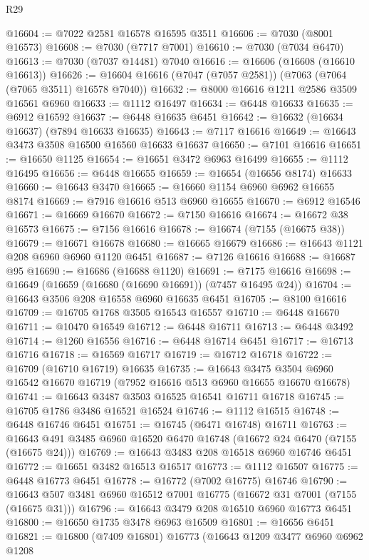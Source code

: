 \begin{lexlean}{R29}
\begin{coremodule}
@16604 := @7022 @2581 @16578 @16595 @3511
@16606 := @7030 (@8001 @16573)
@16608 := @7030 (@7717 @7001)
@16610 := @7030 (@7034 @6470)
@16613 := @7030 (@7037 @14481) @7040
@16616 := @16606 (@16608 (@16610 @16613))
@16626 := @16604 @16616 (@7047 (@7057 @2581)) (@7063 (@7064 (@7065 @3511) @16578 @7040))
@16632 := @8000 @16616 @1211 @2586 @3509 @16561 @6960
@16633 := @1112 @16497
@16634 := @6448 @16633
@16635 := @6912 @16592
@16637 := @6448 @16635 @6451
@16642 := @16632 (@16634 @16637) (@7894 @16633 @16635)
@16643 := @7117 @16616
@16649 := @16643 @3473 @3508 @16500 @16560 @16633 @16637
@16650 := @7101 @16616
@16651 := @16650 @1125
@16654 := @16651 @3472 @6963 @16499
@16655 := @1112 @16495
@16656 := @6448 @16655
@16659 := @16654 (@16656 @8174) @16633
@16660 := @16643 @3470
@16665 := @16660 @1154 @6960 @6962 @16655 @8174
@16669 := @7916 @16616 @513 @6960 @16655
@16670 := @6912 @16546
@16671 := @16669 @16670
@16672 := @7150 @16616
@16674 := @16672 @38 @16573
@16675 := @7156 @16616
@16678 := @16674 (@7155 (@16675 @38))
@16679 := @16671 @16678
@16680 := @16665 @16679
@16686 := @16643 @1121 @208 @6960 @6960 @1120 @6451
@16687 := @7126 @16616
@16688 := @16687 @95
@16690 := @16686 (@16688 @1120)
@16691 := @7175 @16616
@16698 := @16649 (@16659 (@16680 (@16690 @16691)) (@7457 @16495 @24))
@16704 := @16643 @3506 @208 @16558 @6960 @16635 @6451
@16705 := @8100 @16616
@16709 := @16705 @1768 @3505 @16543 @16557
@16710 := @6448 @16670
@16711 := @10470 @16549
@16712 := @6448 @16711
@16713 := @6448 @3492
@16714 := @1260 @16556
@16716 := @6448 @16714 @6451
@16717 := @16713 @16716
@16718 := @16569 @16717
@16719 := @16712 @16718
@16722 := @16709 (@16710 @16719) @16635
@16735 := @16643
    @3475
    @3504
    @6960
    @16542
    @16670
    @16719
    (@7952 @16616 @513 @6960 @16655 @16670 @16678)
@16741 := @16643 @3487 @3503 @16525 @16541 @16711 @16718
@16745 := @16705 @1786 @3486 @16521 @16524
@16746 := @1112 @16515
@16748 := @6448 @16746 @6451
@16751 := @16745 (@6471 @16748) @16711
@16763 := @16643 @491 @3485 @6960 @16520 @6470 @16748 (@16672 @24 @6470 (@7155 (@16675 @24)))
@16769 := @16643 @3483 @208 @16518 @6960 @16746 @6451
@16772 := @16651 @3482 @16513 @16517
@16773 := @1112 @16507
@16775 := @6448 @16773 @6451
@16778 := @16772 (@7002 @16775) @16746
@16790 := @16643 @507 @3481 @6960 @16512 @7001 @16775 (@16672 @31 @7001 (@7155 (@16675 @31)))
@16796 := @16643 @3479 @208 @16510 @6960 @16773 @6451
@16800 := @16650 @1735 @3478 @6963 @16509
@16801 := @16656 @6451
@16821 := @16800
    (@7409 @16801)
    @16773
    (@16643
      @1209
      @3477
      @6960
      @6962
      @1208

\end{coremodule}
\end{lexlean}
